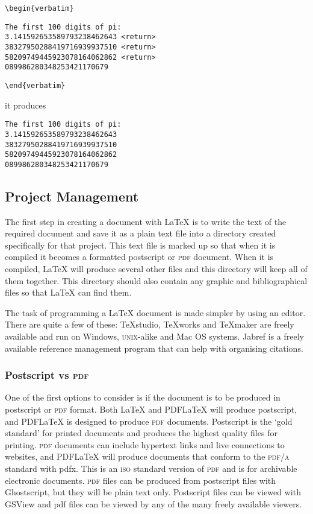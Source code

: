 \documentclass[a4paper]{article}
\begin{document}
\begin{flushleft}
\texttt{\textbackslash begin\{verbatim\}}
\begin{verbatim}
The first 100 digits of pi:
3.141592653589793238462643 <return>
38327950288419716939937510 <return>
58209749445923078164062862 <return>
089986280348253421170679
\end{verbatim}
\texttt{\textbackslash end\{verbatim\}}
\end{flushleft}

it produces

\begin{verbatim}
The first 100 digits of pi:
3.141592653589793238462643
38327950288419716939937510
58209749445923078164062862
089986280348253421170679
\end{verbatim}




\subsection{Project Management}

The first step in creating a document with LaTeX is to write the text of the required document and save it as a plain text file into a directory created specifically for that project. This text file is marked up so that when it is compiled it becomes a formatted postscript or \textsc{pdf} document. When it is compiled, LaTeX will produce several other files and this directory will keep all of them together. This directory should also contain any graphic and bibliographical files so that LaTeX can find them.

The task of programming a LaTeX document is made simpler by using an editor. There are quite a few of these: TeXstudio, TeXworks and TeXmaker are freely available and run on Windows, \textsc{unix}-alike and Mac OS systems. Jabref is a freely available reference management program that can help with organising citations.

\subsubsection{Postscript vs \textsc{pdf}}

One of the first options to consider is if the document is to be produced in postscript or \textsc{pdf} format. Both LaTeX and PDFLaTeX will produce postscript, and PDFLaTeX is designed to produce \textsc{pdf} documents. Postscript is the `gold standard’ for printed documents and produces the highest quality files for printing. \textsc{pdf} documents can include hypertext links and live connections to websites, and PDFLaTeX will produce documents that conform to the \textsc{pdf/a} standard with pdfx. This is an \textsc{iso} standard version of \textsc{pdf} and is for archivable electronic documents. \textsc{pdf} files can be produced from postscript files with Ghostscript, but they will be plain text only. Postscript files can be viewed with GSView and pdf files can be viewed by any of the many freely available viewers.
\end{document}
